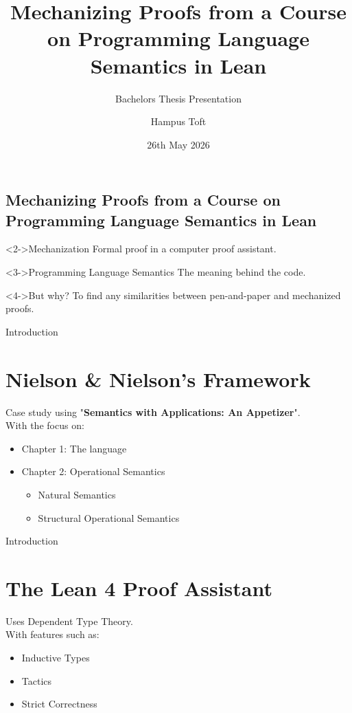 \documentclass[xcolor={dvipsnames,table}]{beamer}
\title{Mechanizing Proofs from a Course on Programming Language Semantics in Lean}
\subtitle{Bachelors Thesis Presentation}
\author{Hampus Toft}
\date{26th May 2026}%
\begin{document}
\begin{frame}
  \titlepage
\end{frame}

\begin{frame}
  \section*{Mechanizing Proofs from a Course on Programming Language Semantics in Lean}  
  \begin{block}<2->{Mechanization}
    \vspace{1pt}
    Formal proof in a computer proof assistant.
  \end{block}

  \begin{block}<3->{Programming Language Semantics}
    \vspace{1pt}
    The meaning behind the code.
  \end{block}

  \begin{block}<4->{But why?}
    \vspace{1pt}
    To find any similarities between pen-and-paper and mechanized proofs.
  \end{block}

\end{frame}

\begin{frame}{Introduction}
  \section*{Nielson \& Nielson's Framework}
  Case study using "\textbf{Semantics with Applications: An Appetizer}". \\
  With the focus on:
  \begin{itemize}
    \item<1-> Chapter 1: The \While language
    \item<2-> Chapter 2: Operational Semantics
      \begin{itemize}
        \item<3-> Natural Semantics
        \item<4-> Structural Operational Semantics
      \end{itemize}
  \end{itemize}
\end{frame}

\begin{frame}{Introduction}
  \section*{The Lean 4 Proof Assistant}
  Uses Dependent Type Theory. \\
  With features such as:
  \begin{itemize}
    \item<2-> Inductive Types
    \item<3-> Tactics
    \item<4-> Strict Correctness
  \end{itemize}
\end{frame}
\end{document}
